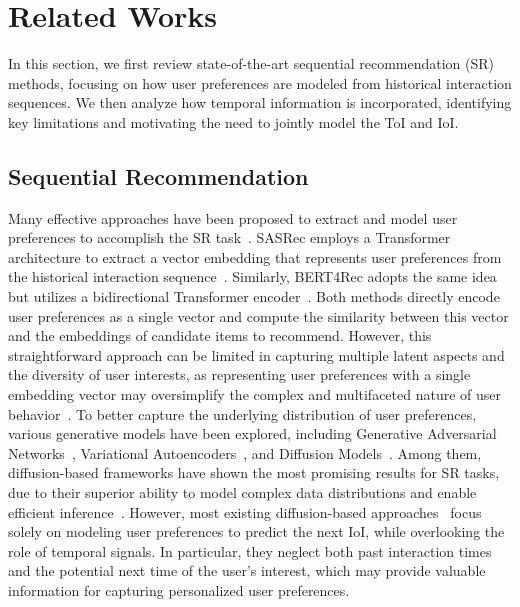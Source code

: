 \documentclass[sigconf,nonacm]{acmart}
\begin{document}
\section{Related Works}

In this section, we first review state-of-the-art sequential recommendation (SR) methods, focusing on how user preferences are modeled from historical interaction sequences. We then analyze how temporal information is incorporated, identifying key limitations and motivating the need to jointly model the ToI and IoI.

\subsection{Sequential Recommendation}
Many effective approaches have been proposed to extract and model user preferences to accomplish the SR task~\cite{huang2025survey}. SASRec employs a Transformer architecture to extract a vector embedding that represents user preferences from the historical interaction sequence~\cite{kang2018self}. Similarly, BERT4Rec adopts the same idea but utilizes a bidirectional Transformer encoder~\cite{sun2019bert4rec}. Both methods directly encode user preferences as a single vector and compute the similarity between this vector and the embeddings of candidate items to recommend. However, this straightforward approach can be limited in capturing multiple latent aspects and the diversity of user interests, as representing user preferences with a single embedding vector may oversimplify the complex and multifaceted nature of user behavior~\cite{li2023diffurec}. To better capture the underlying distribution of user preferences, various generative models have been explored, including Generative Adversarial Networks~\cite{jin2020sampling}, Variational Autoencoders~\cite{liang2018variational}, and Diffusion Models~\cite{dhariwal2021diffusion}. Among them, diffusion-based frameworks have shown the most promising results for SR tasks, due to their superior ability to model complex data distributions and enable efficient inference~\cite{wei2025diffusion, lin2024survey}. However, most existing diffusion-based approaches~\cite{li2023diffurec, yang2023generate, mao2025distinguished, liu2024preference} focus solely on modeling user preferences to predict the next IoI, while overlooking the role of temporal signals. In particular, they neglect both past interaction times and the potential next time of the user's interest, which may provide valuable information for capturing personalized user preferences.
\end{document}
